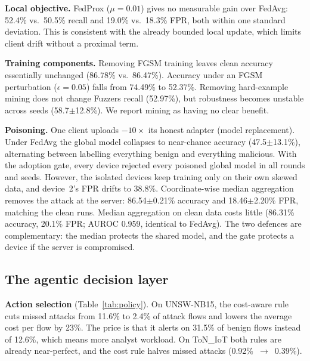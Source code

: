 \textbf{Local objective.} FedProx ($\mu{=}0.01$) gives no measurable gain over
FedAvg: 52.4\% vs.\ 50.5\% recall and 19.0\% vs.\ 18.3\% FPR, both within
one standard deviation. This is consistent with the already bounded local
update, which limits client drift without a proximal term.

\textbf{Training components.} Removing FGSM training leaves clean accuracy
essentially unchanged (86.78\% vs.\ 86.47\%). Accuracy under an FGSM
perturbation ($\epsilon{=}0.05$) falls from 74.49\% to 52.37\%. Removing
hard-example mining does not change Fuzzers recall (52.97\%), but robustness
becomes unstable across seeds (58.7$\pm$12.8\%). We report mining as having
no clear benefit.

\textbf{Poisoning.} One client uploads $-10\times$ its honest adapter
(model replacement). Under FedAvg the global model collapses to near-chance
accuracy (47.5$\pm$13.1\%), alternating between labelling everything benign
and everything malicious. With the adoption gate, every device rejected every
poisoned global model in all rounds and seeds. However, the isolated devices
keep training only on their own skewed data, and device~2's FPR drifts to
38.8\%. Coordinate-wise median aggregation removes the attack at the server:
86.54$\pm$0.21\% accuracy and 18.46$\pm$2.20\% FPR, matching the clean runs.
Median aggregation on clean data costs little (86.31\% accuracy, 20.1\% FPR;
AUROC 0.959, identical to FedAvg). The two defences are complementary: the
median protects the shared model, and the gate protects a device if the
server is compromised.

\subsection{The agentic decision layer}
\textbf{Action selection} (Table~\ref{tab:policy}).
On UNSW-NB15, the cost-aware rule cuts missed attacks from 11.6\% to 2.4\% of
attack flows and lowers the average cost per flow by 23\%. The price is that
it alerts on 31.5\% of benign flows instead of 12.6\%, which means more
analyst workload. On ToN\_IoT both rules are already near-perfect, and the
cost rule halves missed attacks (0.92\%~$\rightarrow$~0.39\%).

\begin{table}[t]\centering
\caption{Per-flow decisions of the frozen model under the default cost table (deterministic; sd $=0$).}
\label{tab:policy}
\end{table}

